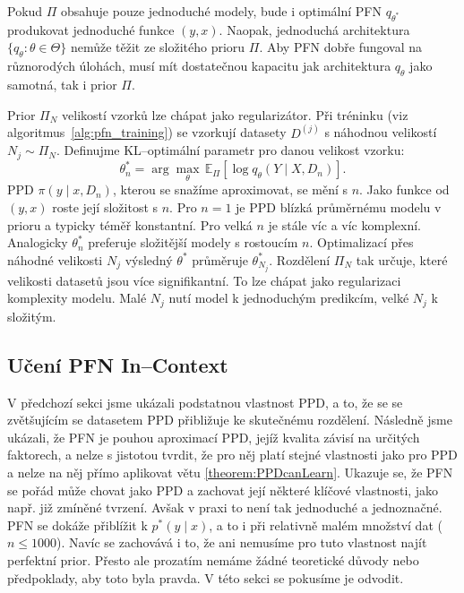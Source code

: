 Pokud $\Pi$ obsahuje pouze jednoduché modely, bude i optimální PFN $q_{\theta^*}$ produkovat jednoduché funkce $(y, x)$. 
Naopak, jednoduchá architektura $\{q_\theta : \theta \in \Theta\}$ nemůže těžit ze složitého prioru $\Pi$. 
Aby PFN dobře fungoval na různorodých úlohách, musí mít dostatečnou kapacitu jak architektura $q_\theta$ jako samotná, tak i prior $\Pi$.

Prior $\Pi_N$ velikostí vzorků lze chápat jako regularizátor.
Při tréninku (viz algoritmus~\ref{alg:pfn_training}) se vzorkují datasety $D^{(j)}$ s náhodnou velikostí $N_j \sim \Pi_N$. 
Definujme KL–optimální parametr pro danou velikost vzorku:
$$\theta^*_n = \arg\max_{\theta} \, \mathbb{E}_\Pi[\log q_\theta(Y \mid X, D_n)].$$
PPD $\pi(y \mid x, D_n)$, kterou se snažíme aproximovat, se mění s $n$. 
Jako funkce od $(y, x)$ roste její složitost s $n$.
Pro $n = 1$ je PPD blízká průměrnému modelu v prioru a typicky téměř konstantní.
Pro velká $n$ je stále víc a víc komplexní. 
Analogicky $\theta^*_n$ preferuje složitější modely s rostoucím $n$.
Optimalizací přes náhodné velikosti $N_j$ výsledný $\theta^*$ průměruje $\theta^*_{N_j}$. 
Rozdělení $\Pi_N$ tak určuje, které velikosti datasetů jsou více signifikantní. 
To lze chápat jako regularizaci komplexity modelu.
Malé $N_j$ nutí model k jednoduchým predikcím, velké $N_j$ k složitým.
\par 

\subsection{Učení PFN In–Context}
\label{subsec:uceni-incontext}
V předchozí sekci jsme ukázali podstatnou vlastnost PPD, a to, že se se zvětšujícím se datasetem PPD přibližuje ke skutečnému rozdělení.
Následně jsme ukázali, že PFN je pouhou aproximací PPD, jejíž kvalita závisí na určitých faktorech, a nelze s jistotou tvrdit, že pro něj platí stejné vlastnosti jako pro PPD a nelze na něj přímo aplikovat větu \ref{theorem:PPDcanLearn}.
Ukazuje se, že PFN se pořád může chovat jako PPD a zachovat její některé klíčové vlastnosti, jako např. již zmíněné tvrzení.
Avšak v praxi to není tak jednoduché a jednoznačné.
PFN se dokáže přiblížit k $p^*(y \mid x)$, a to i při relativně malém množství dat ($n \leq 1000$).
Navíc se zachovává i to, že ani nemusíme pro tuto vlastnost najít perfektní prior.
Přesto ale prozatím nemáme žádné teoretické důvody nebo předpoklady, aby toto byla pravda.
V této sekci se pokusíme je odvodit.
\par   

